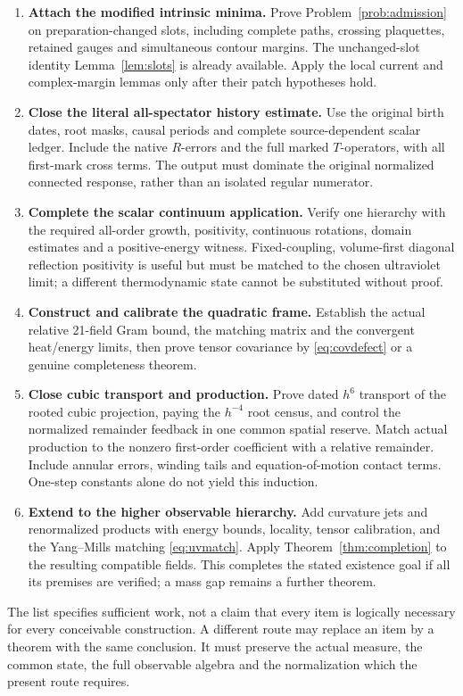 \begin{enumerate}
 \item \textbf{Attach the modified intrinsic minima.}
 Prove Problem~\ref{prob:admission} on preparation-changed slots,
 including complete paths, crossing plaquettes, retained gauges and
 simultaneous contour margins. The unchanged-slot identity
 Lemma~\ref{lem:slots} is already available. Apply the local current
 and complex-margin lemmas only after their patch hypotheses hold.
 \item \textbf{Close the literal all-spectator history estimate.}
 Use the original birth dates, root masks, causal periods and complete
 source-dependent scalar ledger. Include the native \(R\)-errors and
 the full marked \(T\)-operators, with all first-mark cross terms.
 The output must dominate the original normalized connected response,
 rather than an isolated regular numerator.
 \item \textbf{Complete the scalar continuum application.}
 Verify one hierarchy with the required all-order growth, positivity,
 continuous rotations, domain estimates and a positive-energy witness.
 Fixed-coupling, volume-first diagonal reflection positivity is useful
 but must be matched to the chosen ultraviolet limit; a different
 thermodynamic state cannot be substituted without proof.
 \item \textbf{Construct and calibrate the quadratic frame.}
 Establish the actual relative 21-field Gram bound, the matching matrix
 and the convergent heat/energy limits, then prove tensor covariance
 by \eqref{eq:covdefect} or a genuine completeness theorem.
 \item \textbf{Close cubic transport and production.}
 Prove dated \(h^6\) transport of the rooted cubic projection, paying
 the \(h^{-4}\) root census, and control the normalized remainder
 feedback in one common spatial reserve. Match actual production to
 the nonzero first-order coefficient with a relative remainder.
 Include annular errors, winding tails and equation-of-motion contact
 terms. One-step constants alone do not yield this induction.
 \item \textbf{Extend to the higher observable hierarchy.}
 Add curvature jets and renormalized products with energy bounds,
 locality, tensor calibration, and the Yang--Mills matching
 \eqref{eq:uvmatch}. Apply Theorem~\ref{thm:completion} to the resulting
 compatible fields. This completes the stated existence goal if all
 its premises are verified; a mass gap remains a further theorem.
\end{enumerate}

The list specifies sufficient work, not a claim that every item is
logically necessary for every conceivable construction. A different
route may replace an item by a theorem with the same conclusion. It
must preserve the actual measure, the common state, the full observable
algebra and the normalization which the present route requires.

